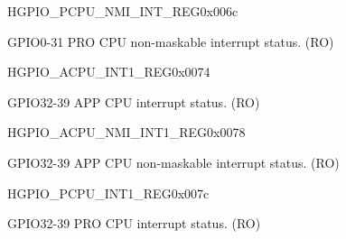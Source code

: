 \begin{register}{H}{GPIO\_PCPU\_NMI\_INT\_REG}{0x006c}\label{regdesc:GPIOPCPUNMIINTREG}
%
\regnewline%
\begin{regdesc}\begin{reglist}
\item [GPIO\_PCPU\_NMI\_INT\_REG]GPIO0-31 PRO CPU non-maskable interrupt status. (RO)
\end{reglist}\end{regdesc}
\end{register}


\begin{register}{H}{GPIO\_ACPU\_INT1\_REG}{0x0074}\label{regdesc:GPIOACPUINT1REG}
%
%
\regnewline%
\begin{regdesc}\begin{reglist}
\item [GPIO\_APPCPU\_INT]GPIO32-39 APP CPU interrupt status. (RO)
\end{reglist}\end{regdesc}
\end{register}


\begin{register}{H}{GPIO\_ACPU\_NMI\_INT1\_REG}{0x0078}\label{regdesc:GPIOACPUNMIINT1REG}
%
%
\regnewline%
\begin{regdesc}\begin{reglist}
\item [GPIO\_APPCPU\_NMI\_INT]GPIO32-39 APP CPU non-maskable interrupt status. (RO)
\end{reglist}\end{regdesc}
\end{register}


\begin{register}{H}{GPIO\_PCPU\_INT1\_REG}{0x007c}\label{regdesc:GPIOPCPUINT1REG}
%
%
\regnewline%
\begin{regdesc}\begin{reglist}
\item [GPIO\_PROCPU\_INT]GPIO32-39 PRO CPU interrupt status. (RO)
\end{reglist}\end{regdesc}
\end{register}


